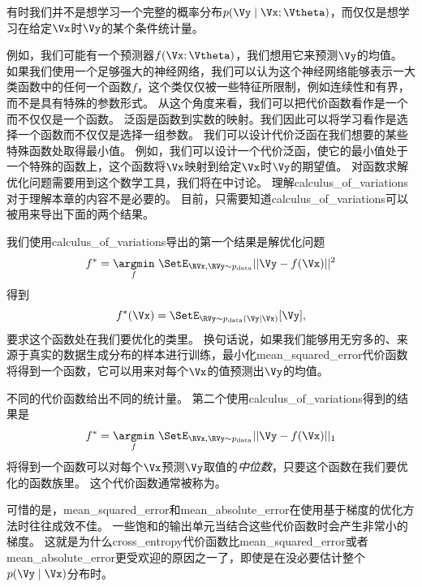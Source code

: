 有时我们并不是想学习一个完整的概率分布$p(\Vy\mid\Vx; \Vtheta)$，而仅仅是想学习在给定$\Vx$时$\Vy$的某个条件统计量。

例如，我们可能有一个预测器$f(\Vx; \Vtheta)$，我们想用它来预测$\Vy$的均值。
如果我们使用一个足够强大的神经网络，我们可以认为这个神经网络能够表示一大类函数中的任何一个函数$f$，这个类仅仅被一些特征所限制，例如连续性和有界，而不是具有特殊的参数形式。
从这个角度来看，我们可以把代价函数看作是一个而不仅仅是一个函数。
泛函是函数到实数的映射。我们因此可以将学习看作是选择一个函数而不仅仅是选择一组参数。
我们可以设计代价泛函在我们想要的某些特殊函数处取得最小值。
例如，我们可以设计一个代价泛函，使它的最小值处于一个特殊的函数上，这个函数将$\Vx$映射到给定$\Vx$时$\Vy$的期望值。
对函数求解优化问题需要用到这个数学工具，我们将在中讨论。
理解\gls{calculus_of_variations}对于理解本章的内容不是必要的。
目前，只需要知道\gls{calculus_of_variations}可以被用来导出下面的两个结果。


我们使用\gls{calculus_of_variations}导出的第一个结果是解优化问题
\begin{equation}
f^* = \underset{f}{\argmin}  \ \SetE_{\RVx, \RVy \sim  p_\text{data}} ||\Vy-f(\Vx)||^2
\end{equation}
得到
\begin{equation}
f^*(\Vx) = \SetE_{\RVy\sim p_\text{data}(\Vy|\Vx)} [\Vy],
\end{equation}
要求这个函数处在我们要优化的类里。
换句话说，如果我们能够用无穷多的、来源于真实的数据生成分布的样本进行训练，最小化\gls{mean_squared_error}代价函数将得到一个函数，它可以用来对每个$\Vx$的值预测出$\Vy$的均值。

不同的代价函数给出不同的统计量。
第二个使用\gls{calculus_of_variations}得到的结果是
\begin{equation}
f^* = \underset{f}{\argmin} \ \SetE_{\RVx, \RVy \sim  p_\text{data}} ||\Vy - f(\Vx)||_1
\end{equation}
将得到一个函数可以对每个$\Vx$预测$\Vy$取值的\emph{中位数}，只要这个函数在我们要优化的函数族里。
这个代价函数通常被称为。

可惜的是，\gls{mean_squared_error}和\gls{mean_absolute_error}在使用基于梯度的优化方法时往往成效不佳。
一些饱和的输出单元当结合这些代价函数时会产生非常小的梯度。
这就是为什么\gls{cross_entropy}代价函数比\gls{mean_squared_error}或者\gls{mean_absolute_error}更受欢迎的原因之一了，即使是在没必要估计整个$p(\Vy\mid\Vx)$分布时。


